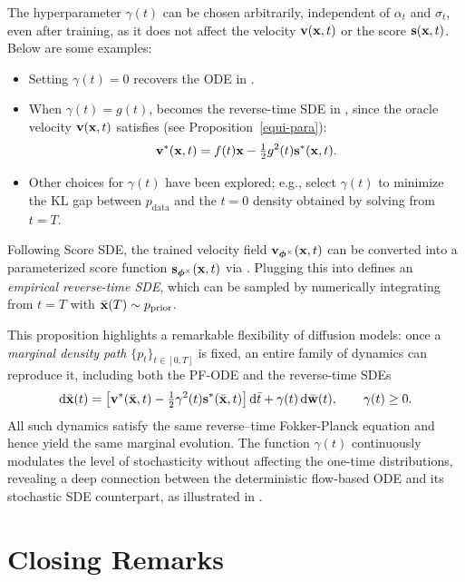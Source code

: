 The hyperparameter $\gamma(t)$ can be chosen arbitrarily, independent of $\alpha_t$ and $\sigma_t$, even after training, as it does not affect the velocity ${\mathbf{v}}({\mathbf{x}}, t)$ or the score ${\mathbf{s}}({\mathbf{x}}, t)$. Below are some examples:
\begin{itemize}
    \item Setting $\gamma(t) = 0$ recovers the ODE in .
    \item When $\gamma(t) = g(t)$,  becomes the reverse-time SDE in , since the oracle velocity ${\mathbf{v}}({\mathbf{x}}, t)$ satisfies (see Proposition~\ref{equi-para}):
    \[
    {\mathbf{v}}^*({\mathbf{x}}, t) = f(t){\mathbf{x}} - \tfrac{1}{2}g^2(t){\mathbf{s}}^*({\mathbf{x}}, t).
    \]
    \item Other choices for $\gamma(t)$ have been explored; e.g., \citet{ma2024sit} select $\gamma(t)$ to minimize the KL gap between $p_{\mathrm{data}}$ and the $t=0$ density obtained by solving  from $t=T$.
\end{itemize}
Following Score SDE, the trained velocity field ${\mathbf{v}}_{\bm{\phi}^\times}({\mathbf{x}}, t)$ can be converted into a parameterized score function ${\mathbf{s}}_{\bm{\phi}^\times}({\mathbf{x}}, t)$ via . Plugging this into  defines an \emph{empirical reverse-time SDE}, which can be sampled by numerically integrating from $t=T$ with $\bar{{\mathbf{x}}}(T) \sim p_{\mathrm{prior}}$.

This proposition highlights a remarkable flexibility of diffusion models: once a \emph{marginal density path} $\{p_t\}_{t\in[0,T]}$ is fixed, an entire family of dynamics can reproduce it, including both the PF-ODE and the reverse-time SDEs
\[
\mathop{}\!\mathrm{d}\bar{{\mathbf{x}}}(t)
=\big[{\mathbf{v}}^*(\bar{{\mathbf{x}}},t)-\tfrac12\gamma^2(t){\mathbf{s}}^*(\bar{{\mathbf{x}}},t)\big]\mathop{}\!\mathrm{d}\bar t
+\gamma(t)\mathop{}\!\mathrm{d}\bar{{\mathbf{w}}}(t),\qquad \gamma(t)\ge0.
\]
All such dynamics satisfy the same reverse--time Fokker-Planck equation and hence yield the same marginal evolution. The function $\gamma(t)$ continuously modulates the level of stochasticity without affecting the one-time distributions, revealing a deep connection between the deterministic flow-based ODE and its stochastic SDE counterpart, as illustrated in .


\newpage

\section{Closing Remarks}\label{subsec:takeaway-dm-gaussianfm}

